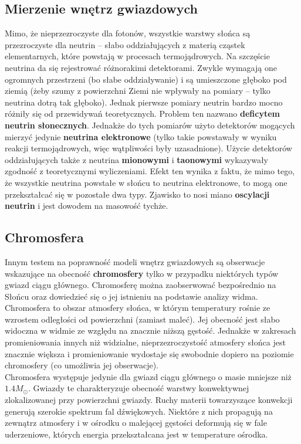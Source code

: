 \documentclass[../index.tex]{subfiles}
\begin{document}
        \subsection{Mierzenie wnętrz gwiazdowych}
            Mimo, że nieprzezroczyste dla fotonów, wszystkie warstwy słońca są przezroczyste dla neutrin – słabo oddziałujących z materią cząstek elementarnych, które powstają w procesach termojądrowych. Na szczęście neutrina da się rejestrować różnorakimi detektorami. Zwykle wymagają one ogromnych przestrzeni (bo słabe oddziaływanie) i są umieszczone głęboko pod ziemią (żeby szumy z powierzchni Ziemi nie wpływały na pomiary – tylko neutrina dotrą tak głęboko). Jednak pierwsze pomiary neutrin bardzo mocno różniły się od przewidywań teoretycznych. Problem ten nazwano \textbf{deficytem neutrin słonecznych}. Jednakże do tych pomiarów użyto detektorów mogących mierzyć jedynie \textbf{neutrina elektronowe} (tylko takie powstawały w wyniku reakcji termojądrowych, więc wątpliwości były uzasadnione). Użycie detektorów oddziałujących także z neutrina \textbf{mionowymi} i \textbf{taonowymi} wykazywały zgodność z teoretycznymi wyliczeniami. Efekt ten wynika z faktu, że mimo tego, że wszystkie neutrina powstałe w słońcu to neutrina elektronowe, to mogą one przekształcać się w pozostałe dwa typy. Zjawisko to nosi miano \textbf{oscylacji neutrin} i jest dowodem na masowość tychże.
        \subsection{Chromosfera}
            Innym testem na poprawność modeli wnętrz gwiazdowych są obserwacje wskazujące na obecność \textbf{chromosfery} tylko w przypadku niektórych typów gwiazd ciągu głównego. Chromosferę można zaobserwować bezpośrednio na Słońcu oraz dowiedzieć się o jej istnieniu na podstawie analizy widma. Chromosfera to obszar atmosfery słońca, w którym temperatury rośnie ze wzrostem odległości od powierzchni (zamiast maleć). Jej obecność jest słabo widoczna w widmie ze względu na znacznie niższą gęstość. Jednakże w zakresach promieniowania innych niż widzialne, nieprzezroczystość atmosfery słońca jest znacznie większa i promieniowanie wydostaje się swobodnie dopiero na poziomie chromosfery (co umożliwia jej obserwacje). \\
            Chromosfera występuje jedynie dla gwiazd ciągu głównego o masie mniejsze niż \(1.4 M_\odot\). Gwiazdy te charakteryzuje obecność warstwy konwektywnej zlokalizowanej przy powierzchni gwiazdy. Ruchy materii towarzyszące konwekcji generują szerokie spektrum fal dźwiękowych. Niektóre z nich propagują na zewnątrz atmosfery i w ośrodku o malejącej gęstości deformują się w fale uderzeniowe, których energia przekształcana jest w temperature ośrodka.
\end{document}

